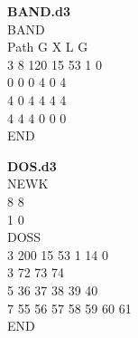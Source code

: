 \documentclass{article}
\begin{document}
\vspace{20pt}

\noindent\begin{minipage}[t]{0.45\textwidth}
    \textbf{BAND.d3}
    \vspace{15pt}
	\\BAND
	\\Path G X L G
	\\3 8 120 15 53 1 0
	\\0 0 0   4 0 4
	\\4 0 4   4 4 4
	\\4 4 4   0 0 0
	\\END
    
\end{minipage}
\hfill
\begin{minipage}[t]{0.45\textwidth}
	\textbf{DOS.d3}
	\vspace{15pt}
	\\NEWK
	\\8 8
	\\1 0
	\\DOSS
	\\3 200 15 53 1 14 0
	\\3   72 73 74
	\\5   36 37 38 39 40
	\\7   55 56 57 58 59 60 61
	\\END
\end{minipage}
\end{document}
